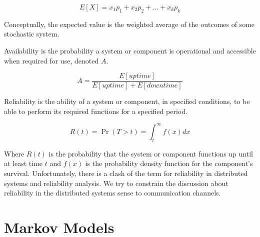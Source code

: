 \begin{equation}E[X] = x_1 p_1 + x_2 p_2 + ... + x_k p_k \end{equation}

Conceptually, the expected value is the weighted average of the outcomes of some stochastic system.

\begin{pdef}
Availability is the probability a system or component is operational and accessible when required for use, denoted $A$.
\end{pdef}

\begin{equation}A = \frac{E[uptime]}{E[uptime]+E[downtime]}\end{equation}

\begin{pdef}
Reliability is the ability of a system or component, in specified conditions, to be able to perform its required functions for a specified period.
\end{pdef}

\begin{equation}R(t) = \Pr(T > t) = \int_t^{\infty} f(x) dx\end{equation}

Where $R(t)$ is the probability that the system or component functions up until at least time $t$ and $f(x)$ is the probability density function for the component's survival.
Unfortunately, there is a clash of the term for reliability in distributed systems and reliability analysis.
We try to constrain the discussion about reliability in the distributed systems sense to communication channels.

\section{Markov Models}


